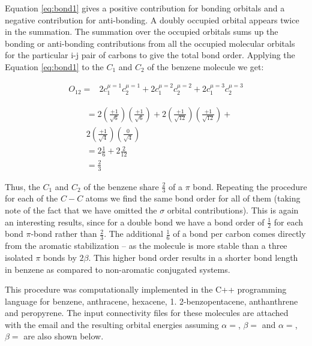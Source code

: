 \documentclass[9pt,twocolumn,twoside]{optica}
\begin{document}
Equation \ref{eq:bond1} gives a positive contribution for bonding orbitals and a
negative contribution for anti-bonding. A doubly occupied orbital appears twice in the summation.  The summation over the occupied orbitals sums up the bonding or anti-bonding contributions from all the occupied molecular orbitals for the particular i-j pair of carbons to give  the total bond order.  Applying the Equation \ref{eq:bond1} to the $C_1$ and $C_2$ of the benzene molecule we get:

\begin{align}
O_{12}=& 2 c_1^{\mu=1} c_2^{\mu=1}+2 c_1^{\mu=2} c_2^{\mu=2}+2 c_1^{\mu=3} c_2^{\mu=3}
\label{eq:bond21}
 \end{align}
 
\begin{align*}
& = 2 \left( \frac{+1}{\sqrt{6}} \right) \left( \frac{+1}{\sqrt{6}} \right)+
2 \left( \frac{+1}{\sqrt{12}} \right) \left( \frac{+1}{\sqrt{12}} \right)+ \\
& 2 \left( \frac{+1}{\sqrt{4}} \right) \left( \frac{0}{\sqrt{4}} \right)\\
& = 2\frac{1}{6}+2\frac{2}{12}\\
& =\frac{2}{3}
 \label{eq:bondz}
 \end{align*} 

Thus, the $C_1$ and $C_2$ of the benzene share $\frac{2}{3}$ of a $\pi$ bond. Repeating the procedure for each of the $C-C$ atoms we find the same bond order for all of them (taking note of the fact that we have omitted the $\sigma$ orbital contributions). This is again an interesting results, since for a double bond we have a bond order of $\frac{1}{2}$ for each   bond   $\pi$-bond rather than $\frac{2}{3}$. The additional $\frac{1}{6}$ of a bond per carbon comes directly from the aromatic stabilization -- as the molecule is more stable than a three isolated $\pi$ bonds by $2\beta$. This higher bond order results in a shorter  bond length in benzene as compared to non-aromatic conjugated systems.

This procedure was computationally implemented in the  C++ programming language for benzene, anthracene,  hexacene,  1. 2-benzopentacene, anthanthrene and  peropyrene. The input connectivity files for these molecules are attached with the email and the resulting orbital energies assuming $\alpha= $, $\beta= $ and $\alpha= $, $\beta= $ are also shown below.
\end{document}
